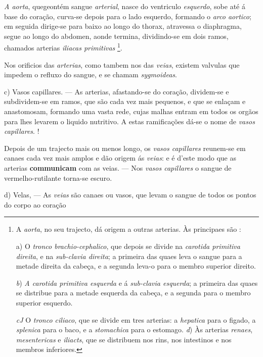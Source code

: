 \emph{A aorta}, quegeontém sangue \emph{arterial}, nasce do ventriculo \emph{esquerdo}, sobe até á base do coração, curva-se depois para o lado esquerdo, formando o \emph{arco aortico}; em seguida dirige-se para baixo ao longo do thorax, atravessa o diaphragma, segue ao longo do abdomen, aonde termina, dividindo-se em dois ramos, chamados arterias \emph{iliacas primitivas} \footnote{A \emph{aorta}, no seu trajecto, dá origem a outras arterias. Às principaes são :\par a) O \emph{tronco brachio-cephalico}, que depois se divide na \emph{carotida primitiva direita}, e na \emph{sub-clavia direita}; a primeira das quaes leva o sangue para a metade direita da cabeça, e a segunda leva-o para o membro superior direito.\par \emph{b}) \emph{A carotida primitiva esquerda} e á \emph{sub-clavia esquerda}; a primeira das quaes se distribue para a metade esquerda da cabeça, e a segunda para o membro superior esquerdo.\par \emph{cJ} O \emph{tronco ciliaco}, que se divide em tres arterias: a \emph{hepatica} para o figado, a \emph{splenica} para o baco, e a \emph{stomachica} para o estomago. \emph{d}) Às arterias \emph{renaes}, \emph{mesentericas} e \emph{iliacts}, que se distribuem nos rins, nos intestinos e nos membros inferiores.}.

Nos orificios das \emph{arterias}, como tambem nos das \emph{veias}, existem valvulas que impedem o refluxo do sangue, e se chamam \emph{sygmoideas}.

c) Vasos capillares. --- As arterias, afastando-se do coração, dividem-se e subdividem-se em ramos, que são cada vez mais pequenos, e que se enlaçam e anastomosam, formando uma vasta rede, cujas malhas entram em todos os orgãos para lhes levarem o liquido nutritivo. A estas ramificações dá-se o nome de \emph{vasos capillares}. !

Depois de um trajecto mais ou menos longo, os \emph{vasos capillares} reunem-se em canaes cada vez mais amplos e dão   origem ás \emph{veias}: e é d'este modo que as arterias \textbf{communicam} com as veias. --- Nos \emph{vasos capillares} o sangue de vermelho-rutilante torna-se escuro.

d) Velas, --- As \emph{veias} são canaes ou vasos, que levam o sangue de todos os pontos do corpo ao coração

